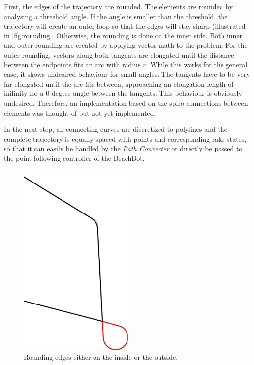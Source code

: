 First, the edges of the trajectory are rounded. The elements are rounded by analysing a threshold angle. If the angle is smaller than the threshold, the trajectory will create an outer loop so that the edges will stay sharp (illustrated in \autoref{fig:rounding}. Otherwise, the rounding is done on the inner side. Both inner and outer rounding are created by applying vector math to the problem. For the outer rounding, vectors along both tangents are elongated until the distance between the endpoints fits an arc with radius $r$. While this works for the general case, it shows undesired behaviour for small angles. The tangents have to be very far elongated until the arc fits between, approaching an elongation length of inifinity for a 0 degree angle between the tangents. This behaviour is obviously undesired. Therefore, an implementation based on the spiro connections between elements was thought of but not yet implemented. 

In the next step, all connecting curves are discretized to polylines and the complete trajectory is equally spaced with points and corresponding rake states, so that it can easily be handled by the \textit{Path Converter} or directly be passed to the point following controller of the BeachBot.

\begin{figure}
\centering
\includegraphics[width=0.5\textwidth]{images/implementation/rounding_edges.pdf}
\caption{Rounding edges either on the inside or the outside.}\label{fig:rounding}
\end{figure}

